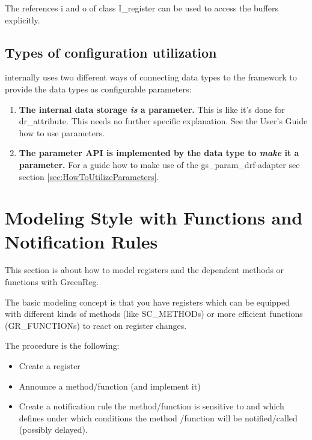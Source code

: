 The references {\sffamily i} and {\sffamily o} of class {\sffamily I\_register} can be used to access the buffers explicitly.


\subsection{Types of configuration utilization}
\label{sec:TypesConfigUtils}
\GreenReg internally uses two different ways of connecting \GreenReg data types to the \GreenConfig framework to provide the \GreenReg data types as configurable parameters:
\begin{enumerate}
  \item {\bf The internal \GreenReg data storage {\em is} a \GreenConfig parameter.} \newline
  This is like it's done for {\sffamily dr\_attribute}. This needs no further \GreenReg specific explanation. See the \GreenConfig User's Guide how to use parameters.
  \item {\bf The parameter API is implemented by the \GreenReg data type to {\em make} it a parameter.} \newline
  For a guide how to make use of the {\sffamily gs\_param\_drf}-adapter see section \ref{sec:HowToUtilizeParameters}.
\end{enumerate}



\section{Modeling Style with Functions and Notification Rules}
\label{sec:ModelingStyleWithFunctionsAndNotificationRules}

This section is about how to model registers and the dependent methods or functions with GreenReg.

The basic modeling concept is that you have registers which can be equipped with different kinds of methods (like SC\_METHODs) or more efficient functions (GR\_FUNCTIONs) to react on register changes.

The procedure is the following:\vspace{-1em}
\begin{itemize}
  \item Create a register  \vspace{-.5em}
  \item Announce a method/function (and implement it) \vspace{-.5em}
  \item Create a notification rule the method/function is sensitive to and which defines under which conditions the method /function will be notified/called (possibly delayed).
\end{itemize}


